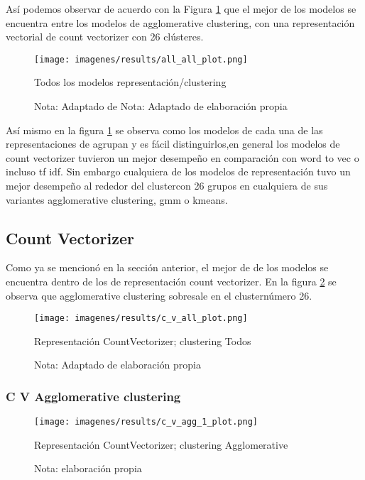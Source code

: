 \documentclass[12pt]{article}
\begin{document}
	Así podemos observar de acuerdo con la Figura \ref{fig:all_all} que el mejor de los modelos se encuentra entre los modelos de agglomerative clustering, con una representación vectorial de count vectorizer con 26 clústeres.
	
	\begin{figure}[H]
		\texttt{[image: imagenes/results/all\_all\_plot.png]}
		\centering
		\caption{Todos los modelos representación/clustering}
		\caption*{\small Nota: Adaptado de  Nota: Adaptado de  elaboración propia}
		\label{fig:all_all}
	\end{figure}
	
	Así mismo en la figura  \ref{fig:all_all} se observa como los modelos de cada una de las representaciones de agrupan y es fácil distinguirlos,en general los modelos de count vectorizer tuvieron un mejor desempeño en comparación con word to vec o incluso tf idf. Sin embargo cualquiera de los modelos de representación tuvo un mejor desempeño al rededor del clustercon 26 grupos en cualquiera de sus variantes agglomerative clustering, gmm o kmeans. 
							
		\subsection{Count Vectorizer}
		Como ya se mencionó en la sección anterior, el mejor de de los modelos se encuentra dentro de los de representación count vectorizer. En la figura \ref{fig:cv_all} se observa que agglomerative clustering sobresale en el clusternúmero 26.
						
		\begin{figure}[H]
			\texttt{[image: imagenes/results/c\_v\_all\_plot.png]}
			\centering
			\caption{Representación CountVectorizer; clustering Todos}
			\caption*{\small Nota: Adaptado de elaboración propia}
			\label{fig:cv_all}
		\end{figure}
		
			\subsubsection{C V Agglomerative clustering}
			\begin{figure}[H]
				\texttt{[image: imagenes/results/c\_v\_agg\_1\_plot.png]}
				\centering
				\caption{Representación CountVectorizer; clustering Agglomerative}
				\caption*{\small Nota:  elaboración propia}
				\label{fig:cv_agg_1}
			\end{figure}
			
\end{document}
